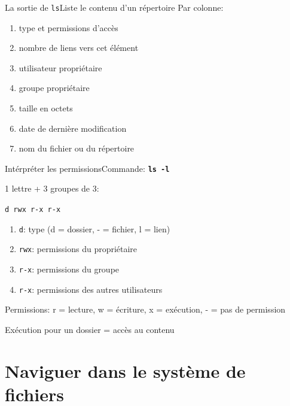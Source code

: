 \documentclass[
aspectratio=169 %
]{beamer}
\newcommand{\cmd}[1]{\texttt{\textbf{#1}}}
\begin{document}
\begin{frame}{La sortie de \texttt{ls}}{Liste le contenu d'un répertoire} Par
    colonne:
    \begin{enumerate}
        \item  type et permissions d'accès
        \item nombre de liens vers cet élément
        \item utilisateur propriétaire
        \item groupe propriétaire
        \item taille en octets
        \item date de dernière modification
        \item nom du fichier ou du répertoire
    \end{enumerate}
\end{frame}

\begin{frame}{Intérpréter les permissions}{Commande: \cmd{ls -l}}

    1 lettre + 3 groupes de 3:

    \smallskip\texttt{d rwx r-x r-x}

    \bigskip

    \begin{enumerate}
        \item \texttt{d}: type (d = dossier, - = fichier, l = lien)
        \item \texttt{rwx}: permissions du propriétaire
        \item \texttt{r-x}: permissions du groupe
        \item \texttt{r-x}: permissions des autres utilisateurs
    \end{enumerate}

    \bigskip Permissions: r = lecture, w = écriture, x = exécution, - = pas de
    permission

    \medskip Exécution pour un dossier = accès au contenu

\end{frame}

\section{Naviguer dans le système de fichiers} \frame{\sectionpage}
\end{document}
